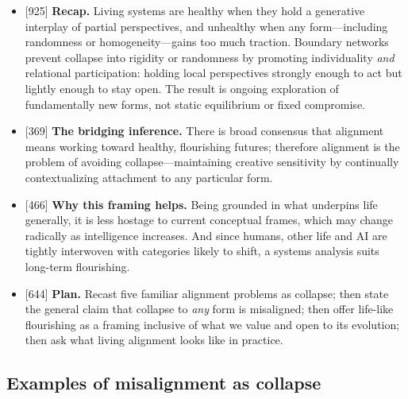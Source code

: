 \documentclass[11pt]{article}
\newcommand{\ct}[1]{{\footnotesize\color{black!55}[#1]}\hspace{1pt}}
\begin{document}
\begin{itemize}
  \item \ct{925} \textbf{Recap.} Living systems are healthy when they hold a generative interplay of partial perspectives, and unhealthy when any form---including randomness or homogeneity---gains too much traction. Boundary networks prevent collapse into rigidity or randomness by promoting individuality \emph{and} relational participation: holding local perspectives strongly enough to act but lightly enough to stay open. The result is ongoing exploration of fundamentally new forms, not static equilibrium or fixed compromise.
  \item \ct{369} \textbf{The bridging inference.} There is broad consensus that alignment means working toward healthy, flourishing futures; therefore alignment is the problem of avoiding collapse---maintaining creative sensitivity by continually contextualizing attachment to any particular form.
  \item \ct{466} \textbf{Why this framing helps.} Being grounded in what underpins life generally, it is less hostage to current conceptual frames, which may change radically as intelligence increases. And since humans, other life and AI are tightly interwoven with categories likely to shift, a systems analysis suits long-term flourishing.
  \item \ct{644} \textbf{Plan.} Recast five familiar alignment problems as collapse; then state the general claim that collapse to \emph{any} form is misaligned; then offer life-like flourishing as a framing inclusive of what we value and open to its evolution; then ask what living alignment looks like in practice.
\end{itemize}

\subsection{Examples of misalignment as collapse}
\end{document}
